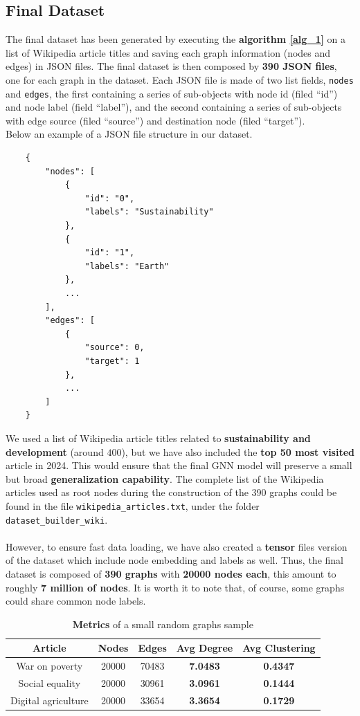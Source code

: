 \documentclass[11pt]{article}
\begin{document}
	\subsection{Final Dataset}
	The final dataset has been generated by executing the \textbf{algorithm \ref{alg_1}} on a list of Wikipedia article titles and saving each graph information (nodes and edges) in JSON files. The final dataset is then composed by \textbf{390 JSON files}, one for each graph in the dataset. Each JSON file is made of two list fields, \texttt{nodes} and \texttt{edges}, the first containing a series of sub-objects with node id (filed ``id'') and node label (field ``label''), and the second containing a series of sub-objects with edge source (filed ``source'') and destination node (filed ``target'').\\
	Below an example of a JSON file structure in our dataset.
	\begin{verbatim}
	{	
		"nodes": [
			{
				"id": "0",
				"labels": "Sustainability"
			},
			{
				"id": "1",
				"labels": "Earth"
			},
			...
		],
		"edges": [
			{
				"source": 0,
				"target": 1
			},
			...
		]
	}
	\end{verbatim}
	We used a list of Wikipedia article titles related to \textbf{sustainability and development} (around $400$), but we have also included the \textbf{top 50 most visited} article in 2024.
	This would ensure that the final GNN model will preserve a small but broad \textbf{generalization capability}.
	The complete list of the Wikipedia articles used as root nodes during the construction of the 390 graphs could be found in the file \texttt{wikipedia\_articles.txt}, under the folder \texttt{dataset\_builder\_wiki}.\\\\
	However, to ensure fast data loading, we have also created a \textbf{tensor} files version of the dataset which include node embedding and labels as well.
	Thus, the final dataset is composed of \textbf{390 graphs} with \textbf{20000 nodes each}, this amount to roughly \textbf{7 million of nodes}. It is worth it to note that, of course, some graphs could share common node labels.\\
	
	\begin{table}[h!]
		\label{table_0}
		\centering
		\begin{tabular}{ccccc}
			\toprule
			Article & Nodes & Edges & \textbf{Avg Degree} & \textbf{Avg Clustering} \\
			\midrule
			War on poverty & 20000 & 70483 & \textbf{7.0483} & \textbf{0.4347} \\
			Social equality & 20000 & 30961 & \textbf{3.0961} & \textbf{0.1444} \\
			Digital agriculture & 20000 & 33654 & \textbf{3.3654} & \textbf{0.1729} \\
			\bottomrule
		\end{tabular}
		\caption{\textbf{Metrics} of a small random graphs sample}
	\end{table}
	
\end{document}
